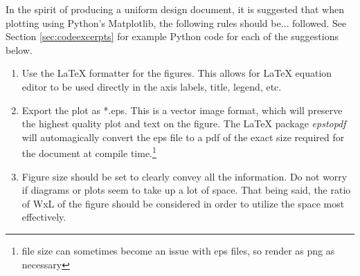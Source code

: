 \documentclass[../main.tex]{subfiles}
\begin{document}
	In the spirit of producing a uniform design document, it is suggested that when plotting using Python's Matplotlib, the following rules should be$\ldots$ followed.  See Section \ref{sec:codeexcerpts} for example Python code for each of the suggestions below.
	
	\begin{enumerate}
		\item Use the \LaTeX{} formatter for the figures.  This allows for \LaTeX{} equation editor to be used directly in the axis labels, title, legend, etc.
		\item Export the plot as *.eps.  This is a vector image format, which will preserve the highest quality plot and text on the figure.  The \LaTeX{} package \textit{epstopdf} will automagically convert the eps file to a pdf of the exact size required for the document at compile time.\footnote{file size can sometimes become an issue with eps files, so render as png as necessary}
		\item Figure size should be set to clearly convey all the information.  Do not worry if diagrams or plots seem to take up a lot of space.  That being said, the ratio of WxL of the figure should be considered in order to utilize the space most effectively.
	\end{enumerate}	
\end{document}
